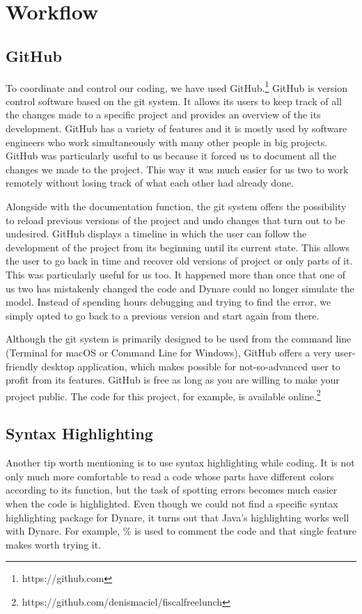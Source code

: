 \section{Workflow}

\subsection*{GitHub}
\label{sub:GitHub}

To coordinate and control our coding, we have used GitHub.\footnote{https://github.com} GitHub is version control software based on the git system. It allows its users to keep track of all the changes made to a specific project and provides an overview of the its development. GitHub has a variety of features and it is mostly used by software engineers who work simultaneously with many other people in big projects. GitHub was particularly useful to us because it forced us to document all the changes we made to the project. This way it was much easier for us two to work remotely without losing track of what each other had already done.

Alongside with the documentation function, the git system offers the possibility to reload previous versions of the project and undo changes that turn out to be undesired. GitHub displays a timeline in which the user can follow the development of the project from its beginning until its current state. This allows the user to go back in time and recover old versions of project or only parts of it. This was particularly useful for us too. It happened more than once that one of us two has mistakenly changed the code and Dynare could no longer simulate the model. Instead of spending hours debugging and trying to find the error, we simply opted to go back to a previous version and start again from there.

Although the git system is primarily designed to be used from the command line (Terminal for macOS or Command Line for Windows), GitHub offers a very user-friendly desktop application, which makes possible for not-so-advanced user to profit from its features. GitHub is free as long as you are willing to make your project public. The code for this project, for example, is available online.\footnote{https://github.com/denismaciel/fiscalfreelunch}


\subsection*{Syntax Highlighting}
\label{sub:Syntax Highlighting}

Another tip worth mentioning is to use syntax highlighting while coding. It is not only much more comfortable to read a code whose parts have different colors according to its function, but the task of spotting errors becomes much easier when the code is highlighted. Even though we could not find a specific syntax highlighting package for Dynare, it turns out that Java's highlighting works well with Dynare. For example, \% is used to comment the code and that single feature makes worth trying it.
